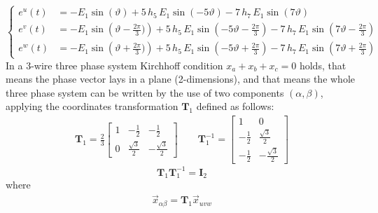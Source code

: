 \documentclass[12pt,a4paper]{scrartcl}
\begin{document}
\begin{onehalfspace}
\begin{equation}\label{uvw_back_emf_1}
	\left\lbrace 
	\begin{aligned}
		e^u(t) & = -E_1\sin\left(\vartheta\right)  + 5\,h_5\,E_1\sin\left(-5\vartheta\right) - 7\,h_7\,E_1\sin\left(7\vartheta\right)\\[6pt]
		e^v(t) & = -E_1\sin\left(\vartheta - \frac{2\pi}{3})\right) + 5\,h_5\,E_1\sin\left(-5\vartheta - \frac{2\pi}{3}\right) - 7\,h_7\,E_1\sin\left(7\vartheta - \frac{2\pi}{3}\right)\\[6pt]
		e^w(t) & = -E_1\sin\left(\vartheta + \frac{2\pi}{3})\right) + 5\,h_5\,E_1\sin\left(-5\vartheta + \frac{2\pi}{3}\right) - 7\,h_7\,E_1\sin\left(7\vartheta + \frac{2\pi}{3}\right)
	\end{aligned}
	\right. 
\end{equation}
In a 3-wire three phase system Kirchhoff condition $x_a+x_b+x_c=0$ holds, that means the phase vector lays in a plane (2-dimensions), and that means the whole three phase system can be 
written by the use of two components $(\alpha,\beta)$, applying the coordinates transformation $\mathbf{T}_1$ defined as follows:
\begin{equation}
	\begin{aligned}
		\mathbf{T}_1 = 
		\frac{2}{3}\begin{bmatrix}
			1 & -\frac{1}{2} & -\frac{1}{2} \\[6pt]
			0 & \frac{\sqrt{3}}{2} & -\frac{\sqrt{3}}{2} 
		\end{bmatrix} \qquad
		\mathbf{T}_1^{-1} = 
		\begin{bmatrix}
			1 & 0 \\[6pt]
			-\frac{1}{2} & \frac{\sqrt{3}}{2} \\[6pt]
			-\frac{1}{2} & -\frac{\sqrt{3}}{2} 
		\end{bmatrix}
	\end{aligned} 
\end{equation}
\begin{equation}
	\mathbf{T}_1\mathbf{T}_1^{-1} = \mathbf{I}_2
\end{equation}
where 
\begin{equation}\label{t1}
	\begin{aligned}
		\vec{x}_{\alpha\beta}=\mathbf{T}_1\vec{x}_{uvw}
	\end{aligned} 
\end{equation}


\end{onehalfspace}
\end{document}
